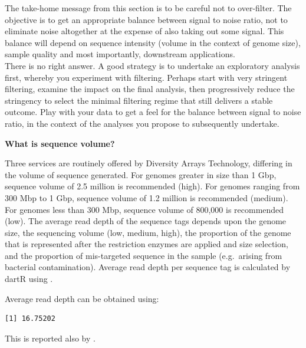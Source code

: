 \documentclass[
  letterpaper,
  DIV=11,
  numbers=noendperiod]{scrreprt}
\newenvironment{Shaded}{\begin{snugshade}}{\end{snugshade}}
\newcommand{\FunctionTok}[1]{\textcolor[rgb]{0.02,0.16,0.49}{#1}}
\newcommand{\NormalTok}[1]{\textcolor[rgb]{0.00,0.44,0.13}{#1}}
\newcommand{\SpecialCharTok}[1]{\textcolor[rgb]{0.25,0.44,0.63}{#1}}
\let\textttOrig\texttt
\renewcommand{\texttt}[1]{\textttOrig{\color{blue}{#1}}}
\begin{document}
The take-home message from this section is to be careful not to
over-filter. The objective is to get an appropriate balance between
signal to noise ratio, not to eliminate noise altogether at the expense
of also taking out some signal. This balance will depend on sequence
intensity (volume in the context of genome size), sample quality and
most importantly, downstream applications.\\
There is no right answer. A good strategy is to undertake an exploratory
analysis first, whereby you experiment with filtering. Perhaps start
with very stringent filtering, examine the impact on the final analysis,
then progressively reduce the stringency to select the minimal filtering
regime that still delivers a stable outcome. Play with your data to get
a feel for the balance between signal to noise ratio, in the context of
the analyses you propose to subsequently undertake.

\textbf{What is sequence volume?}

Three services are routinely offered by Diversity Arrays Technology,
differing in the volume of sequence generated. For genomes greater in
size than 1 Gbp, sequence volume of 2.5 million is recommended (high).
For genomes ranging from 300 Mbp to 1 Gbp, sequence volume of 1.2
million is recommended (medium). For genomes less than 300 Mbp, sequence
volume of 800,000 is recommended (low). The average read depth of the
sequence tags depends upon the genome size, the sequencing volume (low,
medium, high), the proportion of the genome that is represented after
the restriction enzymes are applied and size selection, and the
proportion of mis-targeted sequence in the sample (e.g.~arising from
bacterial contamination). Average read depth per sequence tag is
calculated by dartR using \texttt{gl.report.rdepth()}.

Average read depth can be obtained using:

\begin{Shaded}
\end{Shaded}

\begin{verbatim}
[1] 16.75202
\end{verbatim}

This is reported also by \texttt{gl.report.basics()}.
\end{document}
